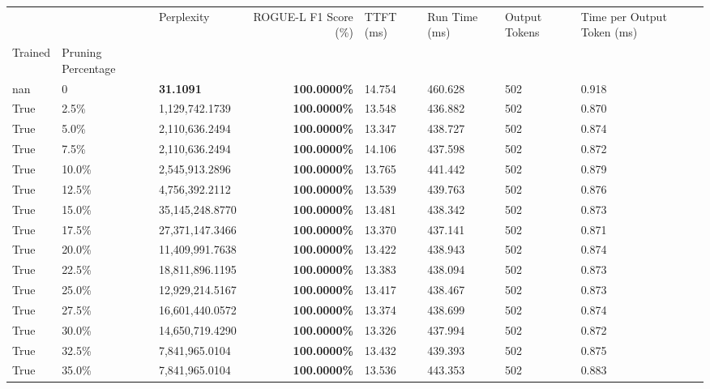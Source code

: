 \begin{table}[H]
\label{tab:evaluation-pipeline-11-trained}
\begin{tabular}{lllrllll}
\toprule
 &  & Perplexity & ROGUE-L F1 Score (\%) & TTFT (ms) & Run Time (ms) & Output Tokens & Time per Output Token (ms) \\
Trained & Pruning Percentage &  &  &  &  &  &  \\
\midrule
nan & 0 & \bfseries 31.1091 & \bfseries 100.0000\% & 14.754 & 460.628 & 502 & 0.918 \\
\cline{1-8}
True & 2.5\% & 1,129,742.1739 & \bfseries \color{red} 100.0000\% & 13.548 & 436.882 & 502 & 0.870 \\
\cline{1-8}
True & 5.0\% & 2,110,636.2494 & \bfseries \color{red} 100.0000\% & 13.347 & 438.727 & 502 & 0.874 \\
\cline{1-8}
True & 7.5\% & 2,110,636.2494 & \bfseries \color{red} 100.0000\% & 14.106 & 437.598 & 502 & 0.872 \\
\cline{1-8}
True & 10.0\% & 2,545,913.2896 & \bfseries \color{red} 100.0000\% & 13.765 & 441.442 & 502 & 0.879 \\
\cline{1-8}
True & 12.5\% & 4,756,392.2112 & \bfseries \color{red} 100.0000\% & 13.539 & 439.763 & 502 & 0.876 \\
\cline{1-8}
True & 15.0\% & 35,145,248.8770 & \bfseries \color{red} 100.0000\% & 13.481 & 438.342 & 502 & 0.873 \\
\cline{1-8}
True & 17.5\% & 27,371,147.3466 & \bfseries \color{red} 100.0000\% & 13.370 & 437.141 & 502 & 0.871 \\
\cline{1-8}
True & 20.0\% & 11,409,991.7638 & \bfseries \color{red} 100.0000\% & 13.422 & 438.943 & 502 & 0.874 \\
\cline{1-8}
True & 22.5\% & 18,811,896.1195 & \bfseries \color{red} 100.0000\% & 13.383 & 438.094 & 502 & 0.873 \\
\cline{1-8}
True & 25.0\% & 12,929,214.5167 & \bfseries \color{red} 100.0000\% & 13.417 & 438.467 & 502 & 0.873 \\
\cline{1-8}
True & 27.5\% & 16,601,440.0572 & \bfseries \color{red} 100.0000\% & 13.374 & 438.699 & 502 & 0.874 \\
\cline{1-8}
True & 30.0\% & 14,650,719.4290 & \bfseries \color{red} 100.0000\% & 13.326 & 437.994 & 502 & 0.872 \\
\cline{1-8}
True & 32.5\% & 7,841,965.0104 & \bfseries \color{red} 100.0000\% & 13.432 & 439.393 & 502 & 0.875 \\
\cline{1-8}
True & 35.0\% & 7,841,965.0104 & \bfseries \color{red} 100.0000\% & 13.536 & 443.353 & 502 & 0.883 \\

\end{tabular}
\end{table}
